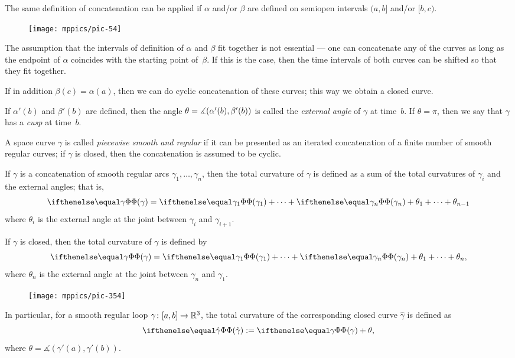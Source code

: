The same definition of concatenation can be applied if $\alpha$ and/or $\beta$ are defined on semiopen intervals 
$(a,b]$ and/or $[b,c)$.

\begin{wrapfigure}{o}{25 mm}
\vskip-3mm
\centering
\texttt{[image: mppics/pic-54]}
\end{wrapfigure}

The assumption that the intervals of definition of $\alpha$ and $\beta$ fit together is not essential --- one can concatenate any of the curves as long as the endpoint of $\alpha$ coincides with the starting point of~$\beta$.
If this is the case, then the time intervals of both curves can be shifted so that they fit together. 

If in addition $\beta(c)=\alpha(a)$, then we can do cyclic concatenation of these curves;
this way we obtain a closed curve.

If $\alpha'(b)$ and $\beta'(b)$ are defined, then the angle $\theta\z=\measuredangle(\alpha'(b),\beta'(b))$ is called the \emph{external angle} of $\gamma$ at time~$b$.
If $\theta=\pi$, then we say that $\gamma$ has a \emph{cusp} at  time~$b$.

A space curve $\gamma$ is called \emph{piecewise smooth and regular} if it can be presented as an iterated concatenation of a finite number of smooth regular curves; if $\gamma$ is closed, then the  concatenation is assumed to be cyclic.

If $\gamma$ is a concatenation of smooth regular arcs $\gamma_1,\dots,\gamma_n$, then the total curvature of $\gamma$ is defined as a sum of the total curvatures of $\gamma_i$ and the external angles;
that is, 
\[\tc\gamma=\tc{\gamma_1}+\dots+\tc{\gamma_n}+\theta_1+\dots+\theta_{n-1}\]
where $\theta_i$ is the external angle at the joint between $\gamma_i$ and $\gamma_{i+1}$.

If $\gamma$ is closed, then the total curvature of $\gamma$ is defined by
\[\tc\gamma=\tc{\gamma_1}+\dots+\tc{\gamma_n}+\theta_1+\dots+\theta_{n},\]
where $\theta_n$ is the external angle at the joint between $\gamma_n$ and $\gamma_1$.

{

\begin{wrapfigure}{r}{23 mm}
\vskip-3mm
\centering
\texttt{[image: mppics/pic-354]}
\end{wrapfigure}

In particular, for a smooth regular loop $\gamma\:[a,b] \z\to \mathbb{R}^3$, the total curvature of the corresponding closed curve $\hat\gamma$ is defined as
\[\tc{\hat\gamma}\df\tc\gamma + \theta,\]
where $\theta=\measuredangle(\gamma'(a),\gamma'(b))$.

}

